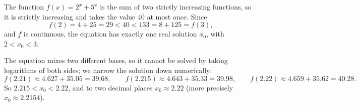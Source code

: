 The function $f(x)=2^x+5^x$ is the sum of two strictly increasing functions, so it is strictly increasing and takes the value $40$ at most once. Since
\[f(2)=4+25=29<40<133=8+125=f(3),\]
and $f$ is continuous, the equation has exactly one real solution $x_0$, with $\boxed{2<x_0<3}$.

The equation mixes two different bases, so it cannot be solved by taking logarithms of both sides; we narrow the solution down numerically:
\[f(2.21)\approx4.627+35.05=39.68,\qquad f(2.215)\approx4.643+35.33=39.98,\qquad f(2.22)\approx4.659+35.62=40.28.\]
So $2.215<x_0<2.22$, and to two decimal places $x_0\approx\boxed{2.22}$ (more precisely $x_0\approx2.2154$).
